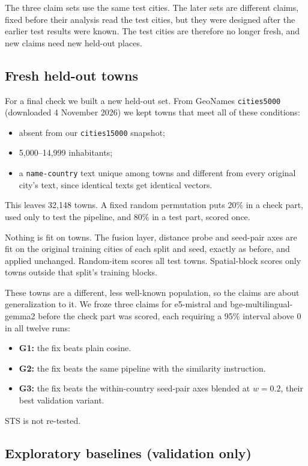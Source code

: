 The three claim sets use the same test cities. The later sets are different claims, fixed before their analysis read the test cities, but they were designed after the earlier test results were known. The test cities are therefore no longer fresh, and new claims need new held-out places.

\subsection{Fresh held-out towns}
\label{sec:method-fresh}

For a final check we built a new held-out set. From GeoNames \texttt{cities5000} (downloaded 4 November 2026) we kept towns that meet all of these conditions:
\begin{itemize}
\item absent from our \texttt{cities15000} snapshot;
\item 5,000--14,999 inhabitants;
\item a \texttt{name-country} text unique among towns and different from every original city's text, since identical texts get identical vectors.
\end{itemize}
This leaves 32,148 towns. A fixed random permutation puts 20\% in a check part, used only to test the pipeline, and 80\% in a test part, scored once.

Nothing is fit on towns. The fusion layer, distance probe and seed-pair axes are fit on the original training cities of each split and seed, exactly as before, and applied unchanged. Random-item scores all test towns. Spatial-block scores only towns outside that split's training blocks.

These towns are a different, less well-known population, so the claims are about generalization to it. We froze three claims for e5-mistral and bge-multilingual-gemma2 before the check part was scored, each requiring a 95\% interval above 0 in all twelve runs:
\begin{itemize}
\item \textbf{G1:} the fix beats plain cosine.
\item \textbf{G2:} the fix beats the same pipeline with the similarity instruction.
\item \textbf{G3:} the fix beats the within-country seed-pair axes blended at $w=0.2$, their best validation variant.
\end{itemize}
STS is not re-tested.

\subsection{Exploratory baselines (validation only)}
\label{sec:method-baselines}

